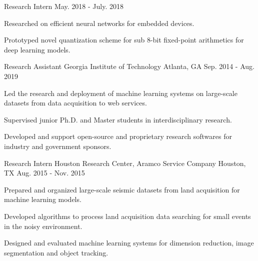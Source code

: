 \begin{cventries}
\cventry
{Research Intern} %
{} %
{} %
{May. 2018 - July. 2018} %
{
		\begin{cvitems} %
				\item {Researched on efficient neural networks for embedded devices.}
				\item {Prototyped novel quantization scheme for sub 8-bit fixed-point arithmetics 
				for deep learning models.}
		\end{cvitems}
}

	\cventry
		{Research Assistant} %
		{Georgia Institute of Technology} %
		{Atlanta, GA} %
		{Sep. 2014 - Aug. 2019} %
		{
			\begin{cvitems} %
				\item {Led the research and deployment of machine learning systems on large-scale %
				datasets from data acquisition to web services.}
				\item {Supervised junior Ph.D. and Master students in interdisciplinary research.}
				\item {Developed and support open-source and proprietary research softwares for %
				industry and government sponsors.}
			\end{cvitems}
		}

	\cventry
		{Research Intern} %
		{Houston Research Center, Aramco Service Company} %
		{Houston, TX} %
		{Aug. 2015 - Nov. 2015} %
		{
			\begin{cvitems} %
				\item {Prepared and organized large-scale seismic datasets from land acquisition %
				for machine learning models.}
				\item {Developed algorithms to process land acquisition data searching for small %
				events in the noisy environment.}
				\item {Designed and evaluated machine learning systems for dimension reduction, %
				image segmentation and object tracking.}
			\end{cvitems}
		}


\end{cventries}
